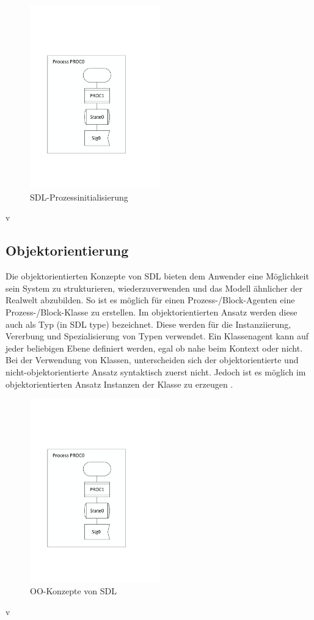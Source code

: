 \begin{figure}[h]
	\centering
	\includegraphics[width=0.5\textwidth]{Graphics/ProcessInit.pdf}
	\caption{SDL-Prozessinitialisierung}
	\label{fig:ProcessInit}
\end{figure}v


\subsection{Objektorientierung} 
\label{ssc:Vererbung}
Die objektorientierten Konzepte von \ac{SDL} bieten dem Anwender eine Möglichkeit sein System zu strukturieren, wiederzuverwenden und das Modell ähnlicher der Realwelt abzubilden. So ist es möglich für einen Prozess-/Block-Agenten eine Prozess-/Block-Klasse zu erstellen. Im objektorientierten Ansatz werden diese auch als Typ (in \ac{SDL} type) bezeichnet. Diese werden für die Instanziierung, Vererbung und Spezialisierung von Typen verwendet. Ein Klassenagent kann auf jeder beliebigen Ebene definiert werden, egal ob nahe beim Kontext oder nicht.
Bei der Verwendung von Klassen, unterscheiden sich der objektorientierte und nicht-objektorientierte Ansatz syntaktisch zuerst nicht. Jedoch ist es möglich im objektorientierten Ansatz Instanzen der Klasse zu erzeugen \cite[4\psqq]{ITUT100_2016}.


\begin{figure}[h]
	\centering
	\includegraphics[width=0.5\textwidth]{Graphics/ProcessInit.pdf}
	\caption{OO-Konzepte von SDL}
	\label{fig:OOKonzept}
\end{figure}v

